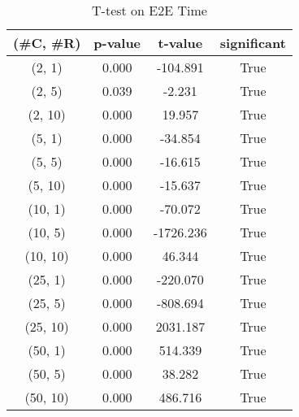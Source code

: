\begin{table}[h]
\centering
\caption{T-test on E2E Time}
\label{tab:t-testExperiment}
\begin{tabular}{|c|c|c|c|}
\toprule
(\#C, \#R) &  p-value &   t-value &  significant \\
\midrule
  (2, 1) &    0.000 &  -104.891 &         True \\
  (2, 5) &    0.039 &    -2.231 &         True \\
 (2, 10) &    0.000 &    19.957 &         True \\
  (5, 1) &    0.000 &   -34.854 &         True \\
  (5, 5) &    0.000 &   -16.615 &         True \\
 (5, 10) &    0.000 &   -15.637 &         True \\
 (10, 1) &    0.000 &   -70.072 &         True \\
 (10, 5) &    0.000 & -1726.236 &         True \\
(10, 10) &    0.000 &    46.344 &         True \\
 (25, 1) &    0.000 &  -220.070 &         True \\
 (25, 5) &    0.000 &  -808.694 &         True \\
(25, 10) &    0.000 &  2031.187 &         True \\
 (50, 1) &    0.000 &   514.339 &         True \\
 (50, 5) &    0.000 &    38.282 &         True \\
(50, 10) &    0.000 &   486.716 &         True \\
\bottomrule
\end{tabular}
\end{table}

